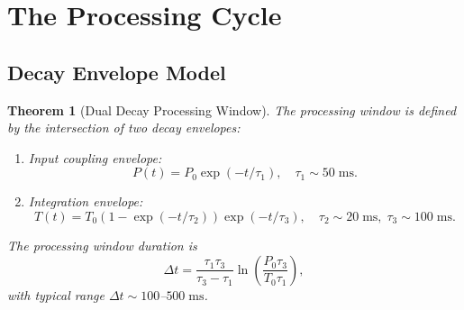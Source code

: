 \documentclass[twocolumn,10pt]{article}
\newtheorem{theorem}{Theorem}[section]
\theoremstyle{remark}
\begin{document}
\section{The Processing Cycle}
\label{sec:cycle}

\subsection{Decay Envelope Model}

\begin{theorem}[Dual Decay Processing Window]
\label{thm:decay}
The processing window is defined by the intersection of two decay envelopes:
\begin{enumerate}
\item Input coupling envelope:
\begin{equation}
P(t) = P_0 \exp(-t/\tau_1), \quad \tau_1 \sim 50\;\mathrm{ms}.
\label{eq:input_envelope}
\end{equation}
\item Integration envelope:
\begin{equation}
T(t) = T_0 (1 - \exp(-t/\tau_2)) \exp(-t/\tau_3), \quad \tau_2 \sim 20\;\mathrm{ms},\; \tau_3 \sim 100\;\mathrm{ms}.
\label{eq:integration_envelope}
\end{equation}
\end{enumerate}
The processing window duration is
\begin{equation}
\Delta t = \frac{\tau_1 \tau_3}{\tau_3 - \tau_1} \ln\!\left(\frac{P_0 \tau_3}{T_0 \tau_1}\right),
\label{eq:window}
\end{equation}
with typical range $\Delta t \sim 100$--$500\;\mathrm{ms}$.
\end{theorem}
\end{document}
